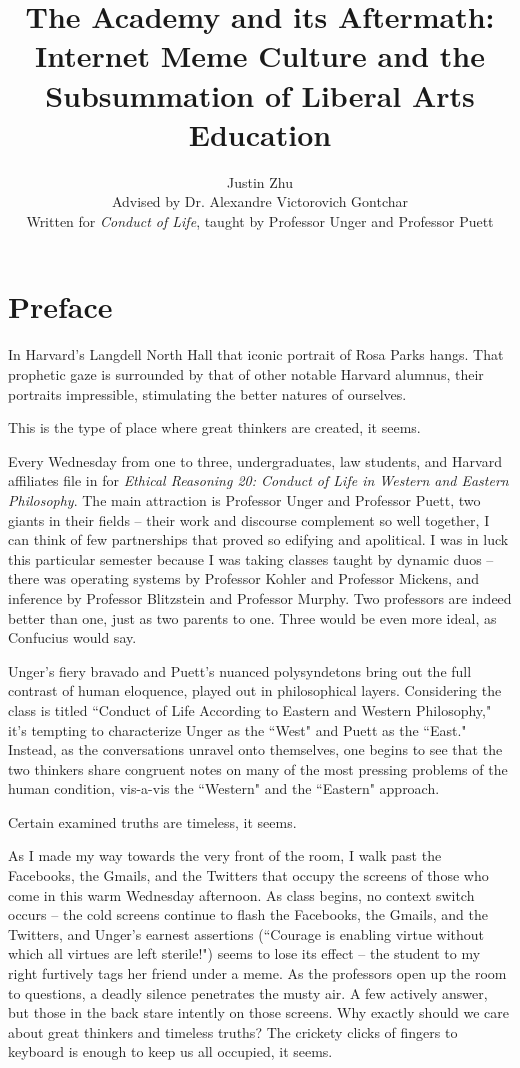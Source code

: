 \documentclass[12pt,letterpaper]{article}
\author{Justin Zhu \\ Advised by Dr. Alexandre Victorovich Gontchar \\ Written for \textit{Conduct of Life}, taught by Professor Unger and Professor Puett}
\title{The Academy and its Aftermath: Internet Meme Culture and the Subsummation of Liberal Arts Education}
\date{}
\begin{document}
\clearpage\maketitle
\thispagestyle{empty}
\pagebreak
\tableofcontents
\pagebreak
\pagestyle{plain}
\setcounter{page}{1}


\section*{Preface}
In Harvard's Langdell North Hall that iconic portrait of Rosa Parks hangs.  That prophetic gaze is surrounded by that of other notable Harvard alumnus, their portraits impressible, stimulating the better natures of ourselves.  

This is the type of place where great thinkers are created, it seems.

Every Wednesday from one to three, undergraduates, law students, and Harvard affiliates file in for \textit{Ethical Reasoning 20: Conduct of Life in Western and Eastern Philosophy}.  The main attraction is Professor Unger and Professor Puett, two giants in their fields -- their work and discourse complement so well together, I can think of few partnerships that proved so edifying and apolitical.  I was in luck this particular semester because I was taking classes taught by dynamic duos -- there was operating systems by Professor Kohler and Professor Mickens, and inference by Professor Blitzstein and Professor Murphy.  Two professors are indeed better than one, just as two parents to one.  Three would be even more ideal, as Confucius would say.

Unger's fiery bravado and Puett's nuanced polysyndetons bring out the full contrast of human eloquence, played out in philosophical layers.  Considering the class is titled ``Conduct of Life According to Eastern and Western Philosophy," it's tempting to characterize Unger as the ``West" and Puett as the ``East."  Instead, as the conversations unravel onto themselves, one begins to see that the two thinkers share congruent notes on many of the most pressing problems of the human condition, vis-a-vis the ``Western" and the ``Eastern" approach.  

Certain examined truths are timeless, it seems.

As I made my way towards the very front of the room, I walk past the Facebooks, the Gmails, and the Twitters that occupy the screens of those who come in this warm Wednesday afternoon.  As class begins, no context switch occurs -- the cold screens continue to flash the Facebooks, the Gmails, and the Twitters, and Unger's earnest assertions (``Courage is enabling virtue without which all virtues are left sterile!") seems to lose its effect -- the student to my right furtively tags her friend under a meme.   As the professors open up the room to questions, a deadly silence penetrates the musty air.  A few actively answer, but those in the back stare intently on those screens.  Why exactly should we care about great thinkers and timeless truths?  The crickety clicks of fingers to keyboard is enough to keep us all occupied, it seems.
\end{document}
